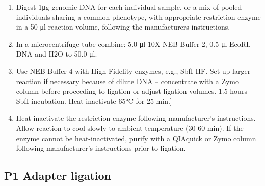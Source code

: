 \documentclass[
  letterpaper,
  DIV=11,
  numbers=noendperiod]{scrreprt}
\begin{document}
\begin{enumerate}
\def\labelenumi{\arabic{enumi}.}
\item
  Digest 1μg genomic DNA for each individual sample, or a mix of pooled
  individuals sharing a common phenotype, with appropriate restriction
  enzyme in a 50 μl reaction volume, following the manufacturers
  instructions.
\item
  In a microcentrifuge tube combine: 5.0 μl 10X NEB Buffer 2, 0.5 μl
  EcoRI, DNA and H2O to 50.0 μl.
\item
  Use NEB Buffer 4 with High Fidelity enzymes, e.g., SbfI-HF. Set up
  larger reaction if necessary because of dilute DNA -- concentrate with
  a Zymo column before proceeding to ligation or adjust ligation
  volumes. 1.5 hours SbfI incubation. Heat inactivate 65°C for 25
  min.{]}
\item
  Heat-inactivate the restriction enzyme following manufacturer's
  instructions. Allow reaction to cool slowly to ambient temperature
  (30-60 min). If the enzyme cannot be heat-inactivated, purify with a
  QIAquick or Zymo column following manufacturer's instructions prior to
  ligation.
\end{enumerate}

\hypertarget{p1-adapter-ligation-1}{%
\subsection{P1 Adapter ligation}\label{p1-adapter-ligation-1}}
\end{document}
